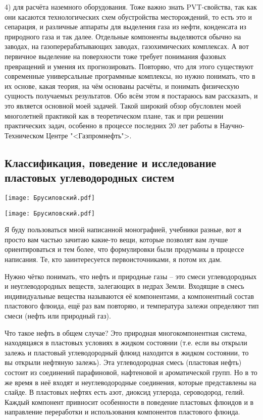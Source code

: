 \documentclass[main.tex]{subfiles}
\begin{document}
4) для расчёта наземного оборудования.
Тоже важно знать PVT-свойства, так как они касаются технологических схем обустройства месторождений, то есть это и сепарация, и различные аппараты для выделения газа из нефти, конденсата из природного газа и так далее.
Отдельные компоненты выделяются обычно на заводах, на газоперерабатывающих заводах, газохимических комплексах.
А вот первичное выделение на поверхности тоже требует понимания фазовых превращений и умения их прогнозировать.
Повторяю, что для этого существуют современные универсальные программные комплексы, но нужно понимать, что в их основе, какая теория, на чём основаны расчёты, и понимать физическую сущность получаемых результатов.
Обо всём этом я постараюсь вам рассказать, и это является основной моей задачей.
Такой широкий обзор обусловлен моей многолетней практикой как в теоретическом плане, так и при решении практических задач, особенно в процессе последних 20 лет работы в Научно-Техническом Центре "<Газпромнефть">.

\subsection{Классификация, поведение и исследование пластовых углеводородных систем}

\begin{center}
\texttt{[image: Брусиловский.pdf]}
\end{center}

\begin{center}
\texttt{[image: Брусиловский.pdf]}
\end{center}

Я буду пользоваться мной написанной монографией, учебники разные, вот я просто вам частью зачитаю какие-то вещи, которые позволят вам лучше ориентироваться и тем более, что формулировки были продуманы в процессе написания.
Те, кто заинтересуется первоисточниками, я потом их дам.

Нужно чётко понимать, что нефть и природные газы -- это смеси углеводородных и неуглеводородных веществ, залегающих в недрах Земли.
Входящие в смесь индивидуальные вещества называются её компонентами, а компонентный состав пластового флюида, ещё раз вам повторяю, и температура залежи определяют тип смеси (нефть или природный газ).

Что такое нефть в общем случае?
Это природная многокомпонентная система, находящаяся в пластовых условиях в жидком состоянии (т.е. если вы открыли залежь и пластовый углеводородный флюид находится в жидком состоянии, то вы открыли нефтяную залежь).
Эта углеводородная смесь (пластовая нефть) состоит из соединений парафиновой, нафтеновой и ароматической групп.
Но в то же время в неё входят и неуглеводородные соединения, которые представлены на слайде.
В пластовых нефтях есть азот, диоксид углерода, сероводород, гелий.
Каждый компонент привносит особенности в поведение пластовых флюидов и в направление переработки и использования компонентов пластового флюида.
\end{document}
